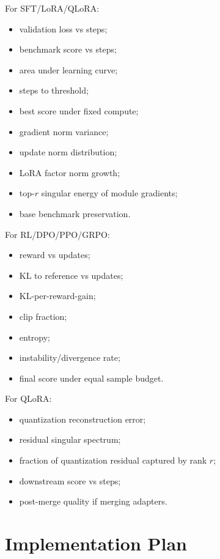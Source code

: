\documentclass[11pt]{article}
\begin{document}
For SFT/LoRA/QLoRA:
\begin{itemize}[leftmargin=*]
    \item validation loss vs steps;
    \item benchmark score vs steps;
    \item area under learning curve;
    \item steps to threshold;
    \item best score under fixed compute;
    \item gradient norm variance;
    \item update norm distribution;
    \item LoRA factor norm growth;
    \item top-$r$ singular energy of module gradients;
    \item base benchmark preservation.
\end{itemize}

For RL/DPO/PPO/GRPO:
\begin{itemize}[leftmargin=*]
    \item reward vs updates;
    \item KL to reference vs updates;
    \item KL-per-reward-gain;
    \item clip fraction;
    \item entropy;
    \item instability/divergence rate;
    \item final score under equal sample budget.
\end{itemize}

For QLoRA:
\begin{itemize}[leftmargin=*]
    \item quantization reconstruction error;
    \item residual singular spectrum;
    \item fraction of quantization residual captured by rank $r$;
    \item downstream score vs steps;
    \item post-merge quality if merging adapters.
\end{itemize}

\section{Implementation Plan}
\end{document}
